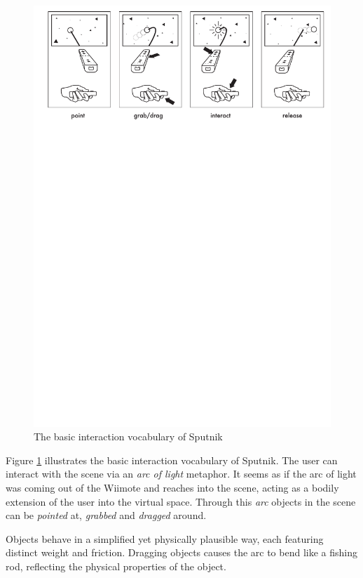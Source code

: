 \documentclass[10pt,a4paper]{scrartcl}
\begin{document}
\begin{figure}[hbtp]
\begin{center}
\includegraphics[width=0.95\columnwidth]{img/sputnik-overview}
\caption{The basic interaction vocabulary of Sputnik}
\label{fig:sputnik-overview}
\end{center}
\end{figure}

Figure \ref{fig:sputnik-overview} illustrates the basic interaction vocabulary of Sputnik. The user can interact with the scene via an \emph{arc of light} metaphor. It seems as if the arc of light was coming out of the Wiimote and reaches into the scene, acting as a bodily extension of the user into the virtual space. Through this \emph{arc} objects in the scene can be \emph{pointed} at, \emph{grabbed} and \emph{dragged} around.

Objects behave in a simplified yet physically plausible way, each featuring distinct weight and friction. Dragging objects causes the arc to bend like a fishing rod, reflecting the physical properties of the object.
\end{document}
